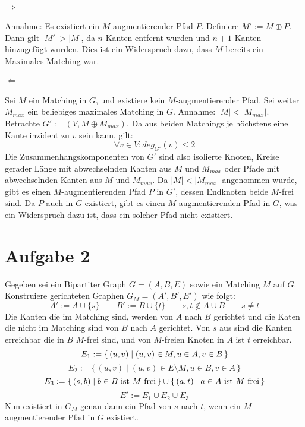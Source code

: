 \documentclass[10pt,a4paper]{article}
\begin{document}
\paragraph{$\Rightarrow$}
Annahme: Es existiert ein $M$-augmentierender Pfad $P$.
Definiere $M' := M \oplus P$. Dann gilt $|M'| > |M|$, da $n$ Kanten entfernt wurden und $n+1$ Kanten hinzugef\"ugt wurden.
Dies ist ein Widerspruch dazu, dass $M$ bereits ein Maximales Matching war.

\paragraph{$\Leftarrow$}
Sei $M$ ein Matching in $G$, und existiere kein $M$-augmentierender Pfad. Sei weiter $M_{max}$ ein beliebiges maximales Matching in $G$. Annahme: $|M| < |M_{max}|$.
Betrachte $G' := (V, M \oplus M_{max})$. Da aus beiden Matchings je h\"ochstens eine Kante inzident zu $v$ sein kann, gilt:
\begin{equation*}
\forall v \in V : deg_{G'}(v) \leq 2
\end{equation*}
Die Zusammenhangskomponenten von $G'$ sind also isolierte Knoten, Kreise gerader L\"ange mit abwechselnden Kanten aus $M$ und $M_{max}$ oder Pfade mit abwechselnden Kanten aus $M$ und $M_{max}$.
Da $|M| < |M_{max}|$ angenommen wurde, gibt es einen $M$-augmentierenden Pfad $P$ in $G'$, dessen Endknoten beide $M$-frei sind. Da $P$ auch in $G$ existiert, gibt es einen $M$-augmentierenden Pfad in $G$, was ein Widerspruch dazu ist, dass ein solcher Pfad nicht existiert.

\section*{Aufgabe 2}
Gegeben sei ein Bipartiter Graph $G = (A, B, E)$ sowie ein Matching $M$ auf $G$. Konstruiere gerichteten Graphen $G_M = (A', B', E')$ wie folgt:
\begin{equation*}
A' := A \cup \{s\}  \qquad B':=B \cup \{t\} \qquad s,t \notin A \cup B \qquad s \neq t
\end{equation*}
Die Kanten die im Matching sind, werden von $A$ nach $B$ gerichtet und die Katen die nicht im Matching sind von $B$ nach $A$ gerichtet. Von $s$ aus sind die Kanten erreichbar die in $B$ $M$-frei sind, und von $M$-freien Knoten in $A$ ist $t$ erreichbar.
\begin{equation*}
E_1 := \{ \, (u, v) \mid (u, v) \in M, u \in A, v \in B \, \} \\
\end{equation*}
\begin{equation*}
E_2 := \{ \, (u, v) \mid (u, v) \in E \setminus M, u \in B, v \in A \, \}
\end{equation*}
\begin{equation*}
E_3 := \{ \, (s, b) \mid b \in B \textnormal{ ist $M$-frei} \, \} \cup \{ \, (a, t) \mid a \in A \textnormal{ ist $M$-frei} \, \}
\end{equation*}
\begin{equation*}
E' := E_1 \cup E_2 \cup E_3
\end{equation*}
Nun existiert in $G_M$ genau dann ein Pfad von $s$ nach $t$, wenn ein $M$-augmentierender Pfad in $G$ existiert.
\end{document}
